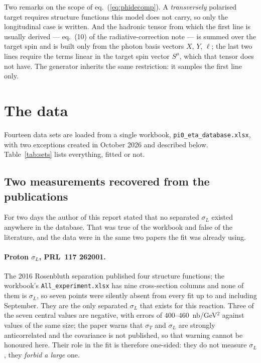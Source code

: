 \documentclass[11pt,a4paper]{article}
\newcommand{\sig}[1]{\sigma_{#1}}
\begin{document}
Two remarks on the scope of eq.~(\ref{eq:phidecomp}).  A \emph{transversely}
polarised target requires structure functions this model does not carry, so only
the longitudinal case is written.  And the hadronic tensor from which the first
line is usually derived --- eq.~(10) of the radiative-correction note --- is
summed over the target spin and is built only from the photon basis vectors
$X$, $Y$, $\ell$; the last two lines require the terms linear in the target spin
vector $S^\mu$, which that tensor does not have.  The generator inherits the
same restriction: it samples the first line only.

\section{The data}

Fourteen data sets are loaded from a single workbook,
\texttt{pi0\_eta\_database.xlsx}, with two exceptions created in October 2026
and described below.  Table~\ref{tab:sets} lists everything, fitted or not.

\begin{table}[htb]
\centering\small
\caption{The database and the fit.  A set marked $--$ is not fitted; its
$\chi^2$ is then a blind prediction.  CLAS12 cross sections are preliminary and are the only blind set left.}
\label{tab:sets}

\end{table}

\subsection{Two measurements recovered from the publications}
\label{sec:recovered}

For two days the author of this report stated that no separated $\sig{L}$
existed anywhere in the database.  That was true of the workbook and false of
the literature, and the data were in the same two papers the fit was already
using.

\paragraph{Proton $\sig{L}$, PRL~\textbf{117} 262001.}  The 2016 Rosenbluth
separation published four structure functions; the workbook's
\texttt{All\_experiment.xlsx} has nine cross-section columns and none of them
is $\sig{L}$, so seven points were silently absent from every fit up to and
including September.  They are the only separated $\sig{L}$ that exists for
this reaction.  Three of the seven central values are negative, with errors of
$400$--$460$~nb/GeV$^2$ against values of the same size; the paper warns that
$\sig{T}$ and $\sig{L}$ are strongly anticorrelated and the covariance is not
published, so that warning cannot be honoured here.  Their role in the fit is
therefore one-sided: they do not measure $\sig{L}$, they \emph{forbid a large}
one.
\end{document}
